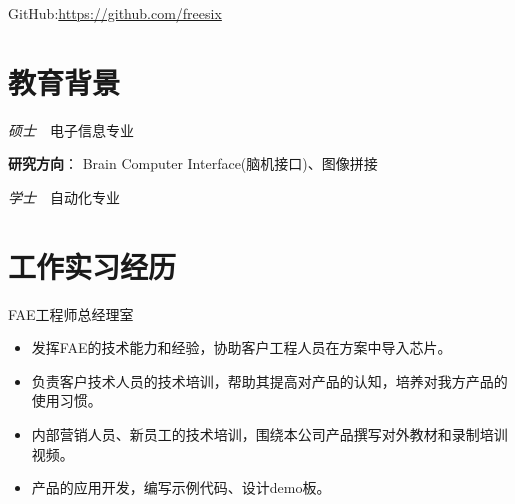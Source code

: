 \documentclass{resume}
\begin{document}


{\centerline{}}
{\centerline{GitHub:\hyperlink{https://github.com/freesix}{https://github.com/freesix}}}




\section{\textcolor[RGB]{50,50,190}{\faGraduationCap 教育背景}}

\textit{硕士}\ \ 电子信息专业

\textcolor[RGB]{80,100,190}{\textbf{研究方向}}：
Brain Computer Interface(脑机接口)、图像拼接


\textit{学士}\ \ 自动化专业

\section{\textcolor[RGB]{50,50,190}{\faBriefcase 工作实习经历}}

FAE工程师\qquad 总经理室
\begin{itemize}
  \item 发挥FAE的技术能力和经验，协助客户工程人员在方案中导入芯片。
  \item 负责客户技术人员的技术培训，帮助其提高对产品的认知，培养对我方产品的使用习惯。
  \item 内部营销人员、新员工的技术培训，围绕本公司产品撰写对外教材和录制培训视频。
  \item 产品的应用开发，编写示例代码、设计demo板。
\end{itemize}
\end{document}
